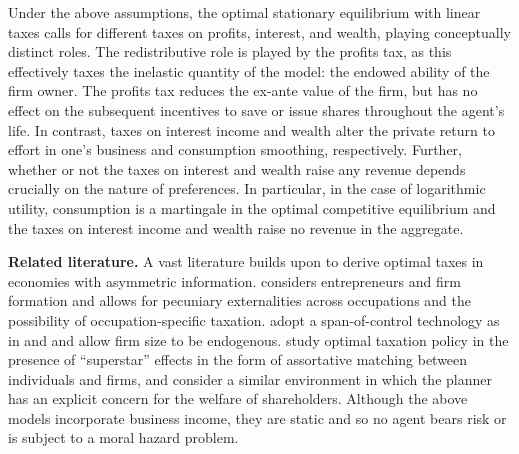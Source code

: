 \documentclass[11pt]{article}
\theoremstyle{plain}
\begin{document}
Under the above assumptions, the optimal stationary equilibrium with linear taxes calls for different taxes on profits, interest, and wealth, playing conceptually distinct roles. The redistributive role is played by the profits tax, as this effectively taxes the inelastic quantity of the model: the endowed ability of the firm owner. The profits tax reduces the ex-ante value of the firm, but has no effect on the subsequent incentives to save or issue shares throughout the agent's life. In contrast, taxes on interest income and wealth alter the private return to effort in one's business and consumption smoothing, respectively. Further, whether or not the taxes on interest and wealth raise any revenue depends crucially on the nature of preferences. In particular, in the case of logarithmic utility, consumption is a martingale in the optimal competitive equilibrium and the taxes on interest income and wealth raise no revenue in the aggregate. 



\textbf{Related literature.} A vast literature builds upon \cite{mirrlees_exploration_1971} to derive optimal taxes in economies with asymmetric information. \cite{scheuer_entrepreneurial_2014} considers entrepreneurs and firm formation and allows for pecuniary externalities across occupations and the possibility of occupation-specific taxation. \cite{ales_taxing_2017} adopt a span-of-control technology as in \cite{rosen_authority_1982} and \cite{lucas_size_1978} and allow firm size to be endogenous. \cite{scheuer_taxation_2017} study optimal taxation policy in the presence of ``superstar'' effects in the form of assortative matching between individuals and firms, and \cite{ales_taxing_2016} consider a similar environment in which the planner has an explicit concern for the welfare of shareholders. Although the above models incorporate business income, they are static and so no agent bears risk or is subject to a moral hazard problem. 
\end{document}
